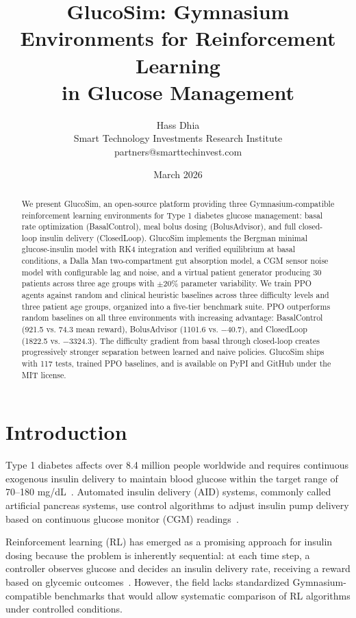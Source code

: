 \documentclass[11pt]{article}
\title{GlucoSim: Gymnasium Environments for Reinforcement Learning\\in Glucose Management}
\author{Hass Dhia\\Smart Technology Investments Research Institute\\partners@smarttechinvest.com}
\date{March 2026}
\begin{document}
\maketitle

\begin{abstract}
We present GlucoSim, an open-source platform providing three Gymnasium-compatible reinforcement learning environments for Type 1 diabetes glucose management: basal rate optimization (BasalControl), meal bolus dosing (BolusAdvisor), and full closed-loop insulin delivery (ClosedLoop). GlucoSim implements the Bergman minimal glucose-insulin model with RK4 integration and verified equilibrium at basal conditions, a Dalla Man two-compartment gut absorption model, a CGM sensor noise model with configurable lag and noise, and a virtual patient generator producing 30 patients across three age groups with $\pm$20\% parameter variability. We train PPO agents against random and clinical heuristic baselines across three difficulty levels and three patient age groups, organized into a five-tier benchmark suite. PPO outperforms random baselines on all three environments with increasing advantage: BasalControl (921.5 vs. 74.3 mean reward), BolusAdvisor (1101.6 vs. $-$40.7), and ClosedLoop (1822.5 vs. $-$3324.3). The difficulty gradient from basal through closed-loop creates progressively stronger separation between learned and naive policies. GlucoSim ships with 117 tests, trained PPO baselines, and is available on PyPI and GitHub under the MIT license.
\end{abstract}

\section{Introduction}

Type 1 diabetes affects over 8.4 million people worldwide and requires continuous exogenous insulin delivery to maintain blood glucose within the target range of 70--180 mg/dL~\citep{kovatchev2009silico}. Automated insulin delivery (AID) systems, commonly called artificial pancreas systems, use control algorithms to adjust insulin pump delivery based on continuous glucose monitor (CGM) readings~\citep{hovorka2004nonlinear}.

Reinforcement learning (RL) has emerged as a promising approach for insulin dosing because the problem is inherently sequential: at each time step, a controller observes glucose and decides an insulin delivery rate, receiving a reward based on glycemic outcomes~\citep{fox2020deep, zhu2020basal}. However, the field lacks standardized Gymnasium-compatible benchmarks that would allow systematic comparison of RL algorithms under controlled conditions.
\end{document}
